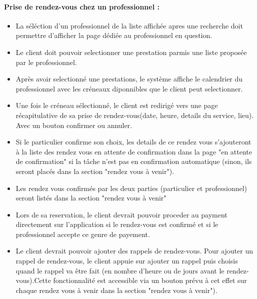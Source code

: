 \documentclass{article}
\begin{document}
\paragraph{Prise de rendez-vous chez un professionnel :}
\begin{itemize}

\item La séléction d'un
  professionnel de la liste affichée apres une recherche doit permettre d'afficher la
  page dédiée au professionnel en question.
\item Le client doit pouvoir selectionner une prestation parmis une liste
  proposée par le professionnel.
\item Après avoir selectionné une prestations, le système affiche le
  calendrier du professionnel avec les créneaux diponnibles que le
  client peut selectionner.
\item Une fois le créneau sélectionné, le client est redirigé vers
    une page récapitulative de sa prise de rendez-vous(date, heure, details du service, lieu). Avec un bouton
    confirmer ou annuler.
\item Si le particulier confirme son choix, les details de ce rendez vous s'ajouteront à la liste des rendez 
vous en attente de confirmation dans la page "en attente de confirmation"
si la tâche n'est pas en confirmation automatique (sinon, ils seront placés dans la section "rendez vous à venir").
\item Les rendez vous confirmés par les deux parties (particulier et professionnel) seront listés dans la section "rendez vous à venir"
\item Lors de sa reservation, le client devrait pouvoir proceder au
  payment directement sur l'application si le rendez-vous est confirmé et si le professionnel accepte ce genre de payement.
\item Le client devrait pouvoir ajouter des
  rappels de rendez-vous. Pour ajouter un rappel de rendez-vous, le
  client appuie sur \og ajouter un rappel \fg{} puis choisis quand le
  rappel va être fait (en nombre d'heure ou de jours avant le
  rendez-vous).Cette fonctionnalité est accessible via un bouton 
  prévu à cet effet sur chaque rendez vous à venir dans la section "rendez vous à venir").



\end{itemize}
\end{document}
